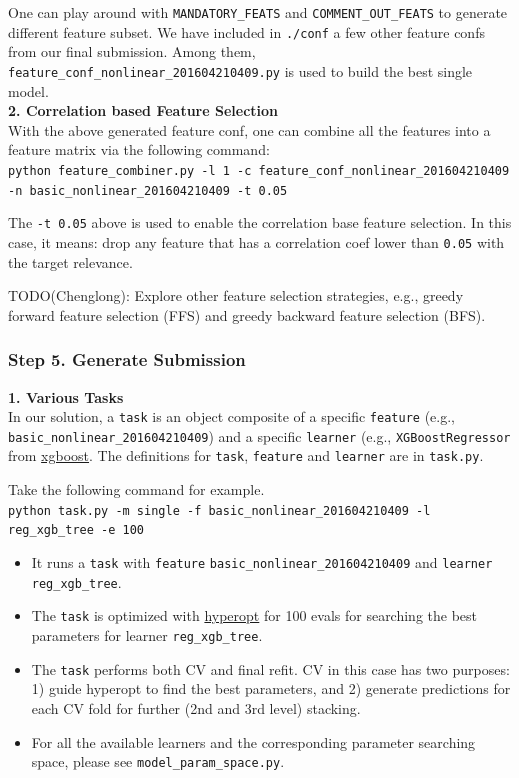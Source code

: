 \documentclass[12pt]{article}
\begin{document}
\begin{appendices}
One can play around with \texttt{MANDATORY\_FEATS} and \texttt{COMMENT\_OUT\_FEATS} to generate different feature subset. We have included in \texttt{./conf} a few other feature confs from our final submission. Among them, \texttt{feature\_conf\_nonlinear\_201604210409.py} is used to build the best single model.\\
\textbf{2. Correlation based Feature Selection}\\
With the above generated feature conf, one can combine all the features into a feature matrix via the following command:\\
\texttt{python feature\_combiner.py -l 1 -c feature\_conf\_nonlinear\_201604210409 -n basic\_nonlinear\_201604210409 -t 0.05}

The \texttt{-t 0.05} above is used to enable the correlation base feature selection. In this case, it means: drop any feature that has a correlation coef lower than \texttt{0.05} with the target relevance.

TODO(Chenglong): Explore other feature selection strategies, e.g., greedy forward feature selection (FFS) and greedy backward feature selection (BFS).

\subsubsection{Step 5. Generate Submission}
\label{subsubsec:GenerateSubmission}
\textbf{1. Various Tasks}\\
In our solution, a \texttt{task} is an object composite of a specific \texttt{feature} (e.g., \texttt{basic\_nonlinear\_201604210409}) and a specific \texttt{learner} (e.g., \texttt{XGBoostRegressor} from \href{https://github.com/dmlc/xgboost}{xgboost}. The definitions for \texttt{task}, \texttt{feature} and \texttt{learner} are in \texttt{task.py}.

Take the following command for example.\\
\texttt{python task.py -m single -f basic\_nonlinear\_201604210409 -l reg\_xgb\_tree -e 100}
\begin{itemize}
\item It runs a \texttt{task} with \texttt{feature} \texttt{basic\_nonlinear\_201604210409} and \texttt{learner} \texttt{reg\_xgb\_tree}.
\item The \texttt{task} is optimized with \href{https://github.com/hyperopt/hyperopt}{hyperopt} for 100 evals for searching the best parameters for learner \texttt{reg\_xgb\_tree}.
\item The \texttt{task} performs both CV and final refit. CV in this case has two purposes: 1) guide hyperopt to find the best parameters, and 2) generate predictions for each CV fold for further (2nd and 3rd level) stacking.
\item For all the available learners and the corresponding parameter searching space, please see \texttt{model\_param\_space.py}.
\end{itemize}


\end{appendices}
\end{document}

